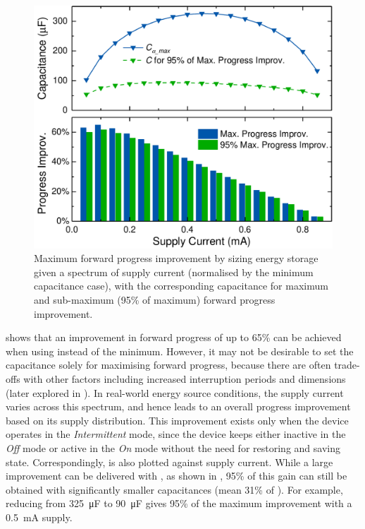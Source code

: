 \begin{figure}
    \centering
    \includegraphics[width=\columnwidth]{ch3_sizingeffect/figures/StorCCurMax4Fig}
    \caption{Maximum forward progress improvement by sizing energy storage given a spectrum of supply current (normalised by the minimum capacitance case), with the corresponding capacitance for maximum and sub-maximum (95\% of maximum) forward progress improvement. }
    \label{fig:maxfwp}
\end{figure}

 shows that an improvement in forward progress of up to 65\%  can be achieved when using  instead of the minimum. 
However, it may not be desirable to set the capacitance solely for maximising forward progress, because there are often trade-offs with other factors including increased interruption periods and dimensions (later explored in ).
In real-world energy source conditions, the supply current varies across this spectrum, and hence leads to an overall progress improvement based on its supply distribution. 
This improvement exists only when the device operates in the \textit{Intermittent} mode, since the device keeps either inactive in the \textit{Off} mode or active in the \textit{On} mode without the need for restoring and saving state. 
Correspondingly,  is also plotted against supply current. 
While a large improvement can be delivered with , as shown in , 95\% of this gain can still be obtained with significantly smaller capacitances (mean 31\% of ).
For example, reducing from \SI{325}{\micro\farad} to \SI{90}{\micro\farad} gives 95\% of the maximum improvement with a \SI{0.5}{\milli\ampere} supply. 

